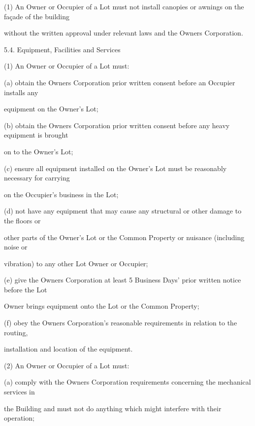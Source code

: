 \documentclass{article}
\begin{document}
{\fontsize{9.962}{1}(1) An Owner or Occupier of a Lot must not install canopies or awnings on the façade of the building }

{\fontsize{10.02}{1}without the written approval under relevant laws and the Owners Corporation. }

{\fontsize{9.99}{1}5.4. Equipment, Facilities and Services }

{\fontsize{9.962}{1}(1) An Owner or Occupier of a Lot must: }

{\fontsize{9.962}{1}(a) obtain the Owners Corporation prior written consent before an Occupier installs any }

{\fontsize{10.02}{1}equipment on the Owner’s Lot; }

{\fontsize{9.962}{1}(b) obtain the Owners Corporation prior written consent before any heavy equipment is brought }

{\fontsize{10.02}{1}on to the Owner’s Lot; }

{\fontsize{9.962}{1}(c) ensure all equipment installed on the Owner’s Lot must be reasonably necessary for carrying }

{\fontsize{10.02}{1}on the Occupier’s business in the Lot; }

{\fontsize{9.962}{1}(d) not have any equipment that may cause any structural or other damage to the floors or }

{\fontsize{10.02}{1}other parts of the Owner’s Lot or the Common Property or nuisance (including noise or }

{\fontsize{10.02}{1}vibration) to any other Lot Owner or Occupier; }

{\fontsize{9.962}{1}(e) give the Owners Corporation at least 5 Business Days’ prior written notice before the Lot }

{\fontsize{10.02}{1}Owner brings equipment onto the Lot or the Common Property; }

{\fontsize{9.962}{1}(f) obey the Owners Corporation’s reasonable requirements in relation to the routing, }

{\fontsize{10.02}{1}installation and location of the equipment. }

{\fontsize{9.962}{1}(2) An Owner or Occupier of a Lot must: }

{\fontsize{9.962}{1}(a) comply with the Owners Corporation requirements concerning the mechanical services in }

{\fontsize{10.02}{1}the Building and must not do anything which might interfere with their operation; }
\end{document}
